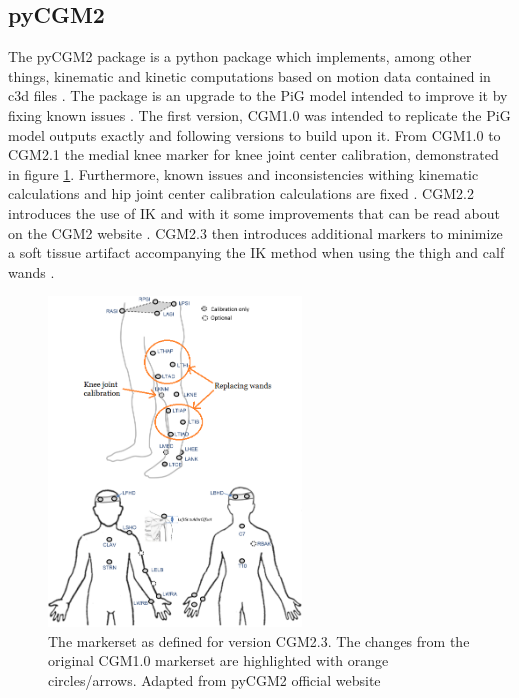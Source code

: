 \documentclass[../main.tex]{subfiles}
\begin{document}
\subsection{pyCGM2}
\label{sec:A-pyCGM2}
The pyCGM2 package is a python package which implements, among other things, kinematic and kinetic computations based on motion data contained in c3d files \cite{Leboeuf2019}.
The package is an upgrade to the \ac{PiG} model intended to improve it by fixing known issues \cite{Leboeuf2019}.
The first version, CGM1.0 was intended to replicate the \ac{PiG} model outputs exactly and following versions to build upon it.
From CGM1.0 to CGM2.1 the medial knee marker for knee joint center calibration, demonstrated in figure \ref{fig:cgm23-markerset-sota}.
Furthermore, known issues and inconsistencies withing kinematic calculations and hip joint center calibration calculations are fixed \cite{Leboeuf2019}.
CGM2.2 introduces the use of \ac{IK} and with it some improvements that can be read about on the CGM2 website \cite{cgm22}. 
CGM2.3 then introduces additional markers to minimize a soft tissue artifact accompanying the \ac{IK} method when using the thigh and calf wands \cite{cgm23}.
\begin{figure}[!hbt]
    \centering
    \includegraphics[width=0.6\textwidth]{img/CGM23_markerset_highlight.png}
    \caption{The markerset as defined for version CGM2.3. The changes from the original CGM1.0 markerset are highlighted with orange circles/arrows. Adapted from pyCGM2 official website \cite{cgm23}}
    \label{fig:cgm23-markerset-sota}
\end{figure}
\end{document}

